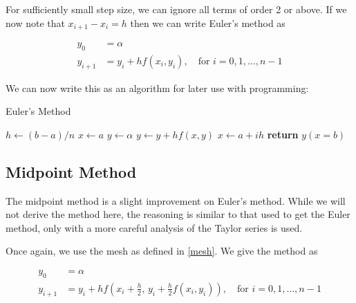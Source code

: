 \documentclass[a4paper,11pt]{report}
\begin{document}
For sufficiently small step size, we can ignore all terms of order 2 or above. If we now note that $x_{i+1} - x_i = h$ then we can write Euler's method as

\begin{equation}\label{euler}
	\begin{aligned}
		y_{0} &= \alpha \\
		y_{i+1} &= y_i + h f(x_i, y_i),  \quad \text{for} \,\, i = 0, 1, \ldots, n-1
	\end{aligned}
\end{equation}

We can now write this as an algorithm for later use with programming:

\begin{algorithm}
\caption{Euler's Method}\label{euler-alg}
\begin{algorithmic}[1]
	\State $h \gets (b-a)/n$
	\State $x \gets a$ 
	\State $y \gets \alpha$ 
		\State $y \gets y + h f(x,y)$ 
		\State $x \gets a + ih$ 
	\EndFor
	\State \textbf{return} $y(x=b)$ 
	\EndProcedure
\end{algorithmic}
\end{algorithm}

\subsection{Midpoint Method}

The midpoint method is a slight improvement on Euler's method. While we will not derive the method here, the reasoning is similar to that used to get the Euler method, only with a more careful analysis of the Taylor series is used.

Once again, we use the mesh as defined in \ref{mesh}. We give the method as \cite{burden}

\begin{equation}\label{midpoint}
	\begin{aligned}
		y_{0} &= \alpha \\
		y_{i+1} &= y_i + h f\left(x_i + \frac{h}{2}, \, y_i + \frac{h}{2} f(x_i, y_i)\right),  \quad \text{for} \,\, i = 0, 1, \ldots, n-1
	\end{aligned}
\end{equation}
\end{document}

